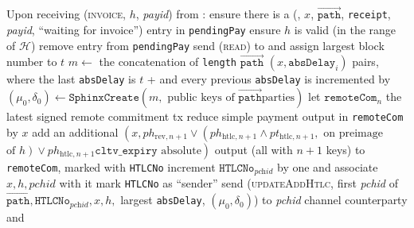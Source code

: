 \begin{algorithmic}[1]
    \State Upon receiving (\textsc{invoice}, $h$, \textit{payid}) from \bob:
    \Indent
      \State ensure there is a (\bob, $x$, $\overrightarrow{\mathtt{path}}$,
      \texttt{receipt}, \textit{payid}, ``waiting for invoice'') entry in
      \texttt{pendingPay}
      \State ensure $h$ is valid (in the range of $\mathcal{H}$)
      \State remove entry from \texttt{pendingPay}
      \State send (\textsc{read}) to \ledger{} and assign largest block number
      to $t$
      \State $m \gets$ the concatenation of \texttt{length}
      $\overrightarrow{\mathtt{path}}$ $\left(x, \mathtt{absDelay}_i\right)$
      pairs, where the last \texttt{absDelay} is $t$ +  and
      every previous \texttt{absDelay} is incremented by 
      \State $\left(\mu_0, \delta_0\right) \gets \mathtt{SphinxCreate}\left(m,
      \text{ public keys of } \overrightarrow{\mathtt{path}} \text{
      parties}\right)$
      \State let $\mathtt{remoteCom}_n$ the latest signed remote commitment tx
      \State reduce simple payment output in \texttt{remoteCom} by $x$
      \State add an additional $\left(x, ph_{\mathrm{rev}, n+1} \vee
      \left(ph_{\mathrm{htlc}, n+1} \wedge pt_{\mathrm{htlc}, n+1}, \text{ on
      preimage}\right.\right.$ $\left.\left.\text{of } h\right) \vee
      ph_{\mathrm{htlc}, n+1}\mathtt{cltv\_expiry} \text{ absolute}\right)$
      output (all with $n+1$ keys) to \texttt{remoteCom}, marked with
      \texttt{HTLCNo}
      \State increment $\mathtt{HTLCNo}_{\textit{pchid}}$ by one and associate
      $x, h, \mathit{pchid}$ with it
      \State mark \texttt{HTLCNo} as ``sender''
      \State send (\textsc{updateAddHtlc}, first \textit{pchid} of
      $\overrightarrow{\mathtt{path}}, \mathtt{HTLCNo}_{\textit{pchid}}, x, h,$
      largest \texttt{absDelay}, $\left(\mu_0, \delta_0\right)$) to
      \textit{pchid} channel counterparty and \adversary
    \EndIndent
    \State


\end{algorithmic}
